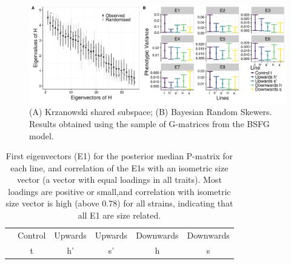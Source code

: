 \begin{refsection}
\begin{figure}
\centering
\includegraphics[width = \linewidth]{chapter_ratones/media/SI/figureS8_Fig2Gversion.png}
\caption[G matrix shared subspace]{(A) Krzanowski shared subspace; (B) Bayesian Random Skewers. Results obtained using the sample of G-matrices from the BSFG model.}
\end{figure}

\begin{table}
    \centering
    \caption[First eigenvectors per line]{First eigenvectors (E1) for the posterior median P-matrix for each line, and correlation of the E1s with an isometric size vector (a vector with equal loadings in all traits). Most loadings are positive or small,and correlation with isometric size vector is high (above 0.78) for all strains, indicating that all E1 are size related.}
    \begin{tabular}{rccccc}
        \hline
      & Control & Upwards  & Upwards & Downwards & Downwards  \\
                & t & h' &  s' &  h &  s \\


\end{tabular}
\end{table}
\end{refsection}
